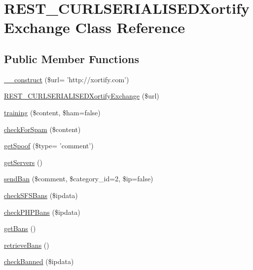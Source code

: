 \hypertarget{class_r_e_s_t___c_u_r_l_s_e_r_i_a_l_i_s_e_d_xortify_exchange}{\section{R\-E\-S\-T\-\_\-\-C\-U\-R\-L\-S\-E\-R\-I\-A\-L\-I\-S\-E\-D\-Xortify\-Exchange Class Reference}
\label{class_r_e_s_t___c_u_r_l_s_e_r_i_a_l_i_s_e_d_xortify_exchange}
}
\subsection*{Public Member Functions}
\begin{DoxyCompactItemize}
\item 
\hyperlink{class_r_e_s_t___c_u_r_l_s_e_r_i_a_l_i_s_e_d_xortify_exchange_a0e33a9b5cea89315431b2d440e576d5f}{\-\_\-\-\_\-construct} (\$url= 'http\-://xortify.\-com')
\item 
\hyperlink{class_r_e_s_t___c_u_r_l_s_e_r_i_a_l_i_s_e_d_xortify_exchange_a7fa5fed254db9c1ef2a324cd17e31b12}{R\-E\-S\-T\-\_\-\-C\-U\-R\-L\-S\-E\-R\-I\-A\-L\-I\-S\-E\-D\-Xortify\-Exchange} (\$url)
\item 
\hyperlink{class_r_e_s_t___c_u_r_l_s_e_r_i_a_l_i_s_e_d_xortify_exchange_a3b3be735e633ba330c6b5d086aa508cd}{training} (\$content, \$ham=false)
\item 
\hyperlink{class_r_e_s_t___c_u_r_l_s_e_r_i_a_l_i_s_e_d_xortify_exchange_a7a4f53c3841dc7806455261af557d514}{check\-For\-Spam} (\$content)
\item 
\hyperlink{class_r_e_s_t___c_u_r_l_s_e_r_i_a_l_i_s_e_d_xortify_exchange_ae7926cba79660f77479306100f492c03}{get\-Spoof} (\$type= 'comment')
\item 
\hyperlink{class_r_e_s_t___c_u_r_l_s_e_r_i_a_l_i_s_e_d_xortify_exchange_a882f365bc81e207dc2123ef707735e82}{get\-Servers} ()
\item 
\hyperlink{class_r_e_s_t___c_u_r_l_s_e_r_i_a_l_i_s_e_d_xortify_exchange_a0293acfa4afe0cb5b2816352a35d8ca7}{send\-Ban} (\$comment, \$category\-\_\-id=2, \$ip=false)
\item 
\hyperlink{class_r_e_s_t___c_u_r_l_s_e_r_i_a_l_i_s_e_d_xortify_exchange_a985a563a84e3e5c54694fcce192bda53}{check\-S\-F\-S\-Bans} (\$ipdata)
\item 
\hyperlink{class_r_e_s_t___c_u_r_l_s_e_r_i_a_l_i_s_e_d_xortify_exchange_aeb1bf9aaee4718870adbd07333490aaf}{check\-P\-H\-P\-Bans} (\$ipdata)
\item 
\hyperlink{class_r_e_s_t___c_u_r_l_s_e_r_i_a_l_i_s_e_d_xortify_exchange_aea26db2906896833d32445a698fc4cdc}{get\-Bans} ()
\item 
\hyperlink{class_r_e_s_t___c_u_r_l_s_e_r_i_a_l_i_s_e_d_xortify_exchange_a4af29af927aae9aada97ef0c2cd08fa1}{retrieve\-Bans} ()
\item 
\hyperlink{class_r_e_s_t___c_u_r_l_s_e_r_i_a_l_i_s_e_d_xortify_exchange_ae41df0f26620b727f7f63342648f6474}{check\-Banned} (\$ipdata)
\end{DoxyCompactItemize}

